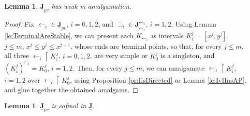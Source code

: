 \documentclass[12pt]{amsart}
\numberwithin{equation}{section}
\theoremstyle{plain}
\newtheorem{lemma}[theorem]{Lemma}
\theoremstyle{definition}
\newcommand \sqsp{\sqsupset}
\newcommand \JJub{\underline{\mathbf{J}}}
\begin{document}
\begin{lemma}
	\label{le:Jp_Amalg}
	$\JJub_{pv}$ has weak m-amalgamation.
\end{lemma}

\begin{proof}
	Fix  ${\leftarrow_i} \in \JJub_{pv}$, $i=0,1,2$, and $\sqsp_i \in \JJub_{\leftarrow_i}^{\leftarrow_0}$, $i=1,2$. Using Lemma \ref{le:TerminalAreStable}, we can present each $K_{\leftarrow_i}$ as intervals $K_i^j=[x^j,y^j]$, $j \leq m$, $x^j \leq y^j \leq x^{j+1}$, whose ends are terminal points, so that, for every $j \leq m$, all three $\leftarrow_i \upharpoonright K_i^j$, $i=0,1,2$, are very simple or $K_0^j$ is a singleton, and $(K^j_i)^{\sqsubset_i}=K^j_0$, $i=1,2$. Then, for every $j \leq m$, we can amalgamate $\leftarrow_i \upharpoonright K_i^j$, $i=1,2$ over $\leftarrow_i \upharpoonright K_0^j$, using Proposition \ref{pr:IisDirected} or Lemma \ref{le:IvHasAP}, and glue together the obtained amalgams.
\end{proof}

\begin{lemma}
	\label{le:SimpleToVerySimple}
	$\JJub_{pv}$ is cofinal in $\JJub$.
\end{lemma}
\end{document}
